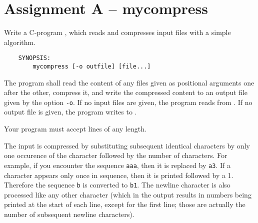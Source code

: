 




\section*{Assignment A -- mycompress}

Write a C-program ,
which reads and compresses input files with a simple algorithm.

\begin{verbatim}
    SYNOPSIS:
        mycompress [-o outfile] [file...]
\end{verbatim}

The program shall read the content of any files given as positional arguments
one after the other, compress it,
and write the compressed content to an output file 
given by the option \verb|-o|.
If no input files are given, the program reads from .
If no output file is given, the program writes to .

Your program must accept lines of any length.

The input is compressed by substituting subsequent identical characters
by only one occurence of the character followed by the number of characters.
For example, if you encounter the sequence \verb|aaa|,
then it is replaced by \verb|a3|.
If a character appears only once in sequence,
then it is printed followed by a 1.
Therefore the sequence \verb|b| is converted to \verb|b1|.
The newline character is also processed like any other character
(which in the output results in numbers being printed at the start of each line,
except for the first line;
those are actually the number of subsequent newline characters).

